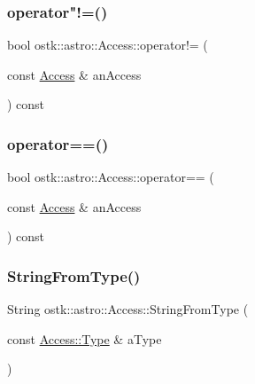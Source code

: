 \subsubsection{\texorpdfstring{operator"!=()}{operator!=()}}
{\footnotesize\ttfamily bool ostk\+::astro\+::\+Access\+::operator!= (\begin{DoxyParamCaption}\item[{const \hyperlink{classostk_1_1astro_1_1_access}{Access} \&}]{an\+Access }\end{DoxyParamCaption}) const}

\mbox{\label{classostk_1_1astro_1_1_access_a4e336578930e1e1d49b7bdc279af4bdf}} 
\subsubsection{\texorpdfstring{operator==()}{operator==()}}
{\footnotesize\ttfamily bool ostk\+::astro\+::\+Access\+::operator== (\begin{DoxyParamCaption}\item[{const \hyperlink{classostk_1_1astro_1_1_access}{Access} \&}]{an\+Access }\end{DoxyParamCaption}) const}

\mbox{\label{classostk_1_1astro_1_1_access_ada64e6a55fe3505b548bdb2651f122e3}} 
\subsubsection{\texorpdfstring{String\+From\+Type()}{StringFromType()}}
{\footnotesize\ttfamily String ostk\+::astro\+::\+Access\+::\+String\+From\+Type (\begin{DoxyParamCaption}\item[{const \hyperlink{classostk_1_1astro_1_1_access_aac00b1a6ead7db92eba5b71e43235c93}{Access\+::\+Type} \&}]{a\+Type }\end{DoxyParamCaption})\hspace{0.3cm}{\ttfamily [static]}}

\mbox{\label{classostk_1_1astro_1_1_access_aa7770be15907d9dabc3ae9a9490e9bad}} 
